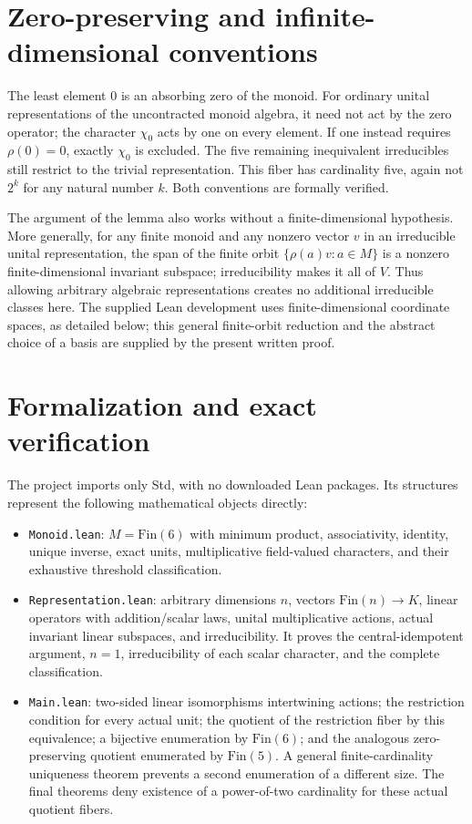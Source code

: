 \documentclass[11pt]{article}
\begin{document}
\section{Zero-preserving and infinite-dimensional conventions}
The least element $0$ is an absorbing zero of the monoid. For ordinary unital representations of the uncontracted monoid algebra, it need not act by the zero operator; the character $\chi_0$ acts by one on every element. If one instead requires $\rho(0)=0$, exactly $\chi_0$ is excluded. The five remaining inequivalent irreducibles still restrict to the trivial representation. This fiber has cardinality five, again not $2^k$ for any natural number $k$. Both conventions are formally verified.

The argument of the lemma also works without a finite-dimensional hypothesis. More generally, for any finite monoid and any nonzero vector $v$ in an irreducible unital representation, the span of the finite orbit $\{\rho(a)v:a\in M\}$ is a nonzero finite-dimensional invariant subspace; irreducibility makes it all of $V$. Thus allowing arbitrary algebraic representations creates no additional irreducible classes here. The supplied Lean development uses finite-dimensional coordinate spaces, as detailed below; this general finite-orbit reduction and the abstract choice of a basis are supplied by the present written proof.

\section{Formalization and exact verification}
The project imports only Std, with no downloaded Lean packages. Its structures represent the following mathematical objects directly:
\begin{itemize}
\item \texttt{Monoid.lean}: $M=\mathrm{Fin}(6)$ with minimum product, associativity, identity, unique inverse, exact units, multiplicative field-valued characters, and their exhaustive threshold classification.
\item \texttt{Representation.lean}: arbitrary dimensions $n$, vectors $\mathrm{Fin}(n)\to K$, linear operators with addition/scalar laws, unital multiplicative actions, actual invariant linear subspaces, and irreducibility. It proves the central-idempotent argument, $n=1$, irreducibility of each scalar character, and the complete classification.
\item \texttt{Main.lean}: two-sided linear isomorphisms intertwining actions; the restriction condition for every actual unit; the quotient of the restriction fiber by this equivalence; a bijective enumeration by $\mathrm{Fin}(6)$; and the analogous zero-preserving quotient enumerated by $\mathrm{Fin}(5)$. A general finite-cardinality uniqueness theorem prevents a second enumeration of a different size. The final theorems deny existence of a power-of-two cardinality for these actual quotient fibers.
\end{itemize}
\end{document}
